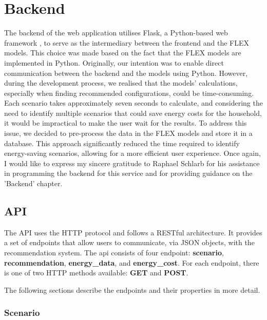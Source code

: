 \section{Backend}

The backend of the web application utilises Flask, a Python-based web framework \cite{flask}, to serve as the intermediary between the frontend and the FLEX models. 
This choice was made based on the fact that the FLEX models are implemented in Python. 
Originally, our intention was to enable direct communication between the backend and the models using Python. 
However, during the development process, we realised that the models' calculations, especially when finding recommended configurations, could be time-consuming. 
Each scenario takes approximately seven seconds to calculate, and considering the need to identify multiple scenarios that could save energy costs for the household, 
it would be impractical to make the user wait for the results. 
To address this issue, we decided to pre-process the data in the FLEX models and store it in a database. 
This approach significantly reduced the time required to identify energy-saving scenarios, allowing for a more efficient user experience.
Once again, I would like to express my sincere gratitude to Raphael Schlarb for his assistance in programming the backend for this service 
and for providing guidance on the 'Backend' chapter. 


\subsection{API}

The API uses the HTTP protocol and follows a RESTful architecture. 
It provides a set of endpoints that allow users to communicate, via JSON objects,
with the recommendation system.
The api consists of four endpoint: \textbf{scenario}, \textbf{recommendation}, \textbf{energy\_data}, and \textbf{energy\_cost}.
For each endpoint, there is one of two HTTP methods available: \textbf{GET} and \textbf{POST}.

The following sections describe the endpoints and their properties in more detail.


\subsubsection{Scenario}

